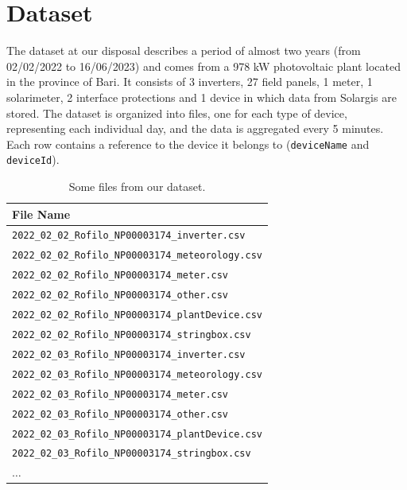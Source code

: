 \section{Dataset}

The dataset at our disposal describes a period of almost two years
(from 02/02/2022 to 16/06/2023) and comes from a 978 kW photovoltaic
plant located in the province of Bari. It consists of 3 inverters,
27 field panels, 1 meter, 1 solarimeter, 2 interface protections
and 1  device in which data from Solargis are stored.
The dataset is organized into files, one for each type of device,
representing each individual day, and the data is aggregated
every 5 minutes. Each row contains a reference to the device
it belongs to (\verb|deviceName| and \verb|deviceId|).



\begin{table}[H]
	\begin{center}
		\begin{tabular}[c]{l}
			\hline
			\textbf{File Name}                                  \\
			\hline
			\verb|2022_02_02_Rofilo_NP00003174_inverter.csv|    \\
			\verb|2022_02_02_Rofilo_NP00003174_meteorology.csv| \\
			\verb|2022_02_02_Rofilo_NP00003174_meter.csv|       \\
			\verb|2022_02_02_Rofilo_NP00003174_other.csv|       \\
			\verb|2022_02_02_Rofilo_NP00003174_plantDevice.csv| \\
			\verb|2022_02_02_Rofilo_NP00003174_stringbox.csv|   \\
			\verb|2022_02_03_Rofilo_NP00003174_inverter.csv|    \\
			\verb|2022_02_03_Rofilo_NP00003174_meteorology.csv| \\
			\verb|2022_02_03_Rofilo_NP00003174_meter.csv|       \\
			\verb|2022_02_03_Rofilo_NP00003174_other.csv|       \\
			\verb|2022_02_03_Rofilo_NP00003174_plantDevice.csv| \\
			\verb|2022_02_03_Rofilo_NP00003174_stringbox.csv|   \\
			$\ldots$                                            \\
			\hline
		\end{tabular}
	\end{center}
	\caption{Some files from our dataset.}\label{tab:datasunto}
\end{table}

